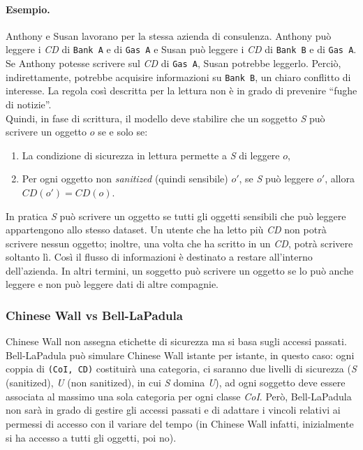 \paragraph{Esempio.}
Anthony e Susan lavorano per la stessa azienda di consulenza.
Anthony può leggere i \textit{CD} di \verb|Bank A| e di \verb|Gas A| e Susan
può leggere i \textit{CD} di \verb|Bank B| e di \verb|Gas A|. Se Anthony potesse
scrivere sul \textit{CD} di \verb|Gas A|, Susan potrebbe leggerlo. Perciò,
indirettamente, potrebbe acquisire informazioni su
\verb|Bank B|, un chiaro conflitto di interesse. La regola così descritta per la
lettura non è in grado di prevenire “fughe di notizie”.\\

Quindi, in fase di scrittura, il modello deve stabilire che un soggetto \textit{S}
può scrivere un oggetto \(o\) se e solo se:

\begin{enumerate}
      \item La condizione di sicurezza in lettura permette a \textit{S} di
            leggere \(o\),
      \item Per ogni oggetto non \textit{sanitized} (quindi sensibile) \(o'\),
            se \textit{S} può leggere \(o'\), allora \(CD(o') = CD(o)\).
\end{enumerate}

In pratica \textit{S} può scrivere un oggetto se tutti gli oggetti sensibili
che può leggere appartengono allo stesso dataset. Un utente che ha letto più
\textit{CD} non potrà scrivere nessun oggetto; inoltre, una volta
che ha scritto in un \textit{CD}, potrà scrivere soltanto lì.
Così il flusso di informazioni è destinato a restare all'interno dell'azienda.
In altri termini, un
soggetto può scrivere un oggetto se lo può anche leggere e non può leggere dati
di altre compagnie.

\subsubsection{Chinese Wall vs Bell-LaPadula}

Chinese Wall non assegna etichette di sicurezza
ma si basa sugli accessi passati. Bell-LaPadula può
simulare Chinese Wall istante per istante, in questo
caso: ogni coppia di \verb|(CoI, CD)| costituirà una
categoria, ci saranno due livelli di sicurezza (\textit{S}
(sanitized), \textit{U} (non sanitized), in cui \textit{S} domina \textit{U}),
ad ogni soggetto deve essere associata al massimo
una sola categoria per ogni classe \textit{CoI}. Però,
Bell-LaPadula non sarà in grado di gestire gli
accessi passati e di adattare i vincoli relativi ai
permessi di accesso con il variare del tempo (in
Chinese Wall infatti, inizialmente si ha accesso a
tutti gli oggetti, poi no).

